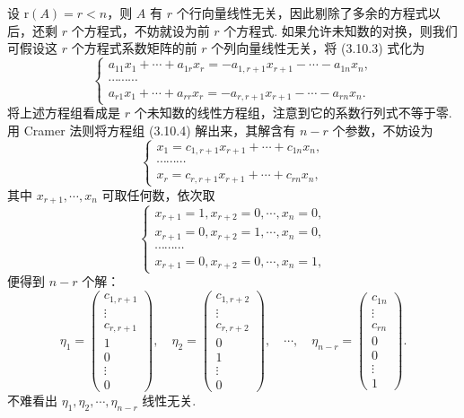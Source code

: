 \documentclass[UTF8,12pt,a4paper,fontset=fandol]{ctexart}
\begin{document}
设 $\mathrm{r}(A)=r<n$，则 $A$ 有 $r$ 个行向量线性无关，因此剔除了多余的方程式以后，还剩 $r$ 个方程式，不妨就设为前 $r$ 个方程式. 如果允许未知数的对换，则我们可假设这 $r$ 个方程式系数矩阵的前 $r$ 个列向量线性无关，将 (3.10.3) 式化为
\begin{equation}
\left\{\begin{array}{c}
a_{11}x_1+\cdots+a_{1r}x_r=-a_{1,r+1}x_{r+1}-\cdots-a_{1n}x_n,\\
\cdots\cdots\cdots\\
a_{r1}x_1+\cdots+a_{rr}x_r=-a_{r,r+1}x_{r+1}-\cdots-a_{rn}x_n.
\end{array}\right.
\tag{3.10.4}
\end{equation}
将上述方程组看成是 $r$ 个未知数的线性方程组，注意到它的系数行列式不等于零. 用 Cramer 法则将方程组 (3.10.4) 解出来，其解含有 $n-r$ 个参数，不妨设为
\begin{equation}
\left\{\begin{array}{c}
x_1=c_{1,r+1}x_{r+1}+\cdots+c_{1n}x_n,\\
\cdots\cdots\cdots\\
x_r=c_{r,r+1}x_{r+1}+\cdots+c_{rn}x_n,
\end{array}\right.
\tag{3.10.5}
\end{equation}
其中 $x_{r+1},\cdots,x_n$ 可取任何数，依次取
\[
\left\{\begin{array}{c}
x_{r+1}=1,x_{r+2}=0,\cdots,x_n=0,\\
x_{r+1}=0,x_{r+2}=1,\cdots,x_n=0,\\
\cdots\cdots\cdots\\
x_{r+1}=0,x_{r+2}=0,\cdots,x_n=1,
\end{array}\right.
\]
便得到 $n-r$ 个解：
\[
\eta_1=\left(\begin{array}{c}
c_{1,r+1}\\
\vdots\\
c_{r,r+1}\\
1\\
0\\
\vdots\\
0
\end{array}\right),\quad
\eta_2=\left(\begin{array}{c}
c_{1,r+2}\\
\vdots\\
c_{r,r+2}\\
0\\
1\\
\vdots\\
0
\end{array}\right),\quad \cdots,\quad
\eta_{n-r}=\left(\begin{array}{c}
c_{1n}\\
\vdots\\
c_{rn}\\
0\\
0\\
\vdots\\
1
\end{array}\right).
\]
不难看出 $\eta_1,\eta_2,\cdots,\eta_{n-r}$ 线性无关.
\end{document}
